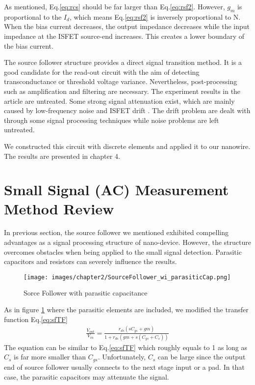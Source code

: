 As mentioned, Eq.\ref{eq:rcs} should be far larger than Eq.\ref{eq:rsf2}.
However, $g_m$ is proportional to the $I_d$, which means Eq.\ref{eq:rsf2} is inversely proportional to N.
When the bias current decreases, the output impedance decreases while the input impedance at the ISFET source-end increases.
This creates a lower boundary of the bias current.

The source follower structure provides a direct signal transition method.
It is a good candidate for the read-out circuit with the aim of detecting transconductance or threshold voltage variance.
Nevertheless, post-processing such as amplification and filtering are necessary.
The experiment results in the article are untreated.
Some strong signal attenuation exist, which are mainly caused by low-frequency noise and ISFET drift \cite{Drift}.
The drift problem are dealt with through some signal processing techniques while noise problems are left untreated.

We constructed this circuit with discrete elements and applied it to our nanowire. The results are presented in chapter 4.


\section{Small Signal (AC) Measurement Method Review}
In previous section, the source follower we mentioned exhibited compelling advantages as a signal processing structure of nano-device.
However, the structure overcomes obstacles when being applied to the small signal detection.
Parasitic capacitors and resistors can severely influence the results.

\begin{figure}[h]
    \centering
    \texttt{[image: images/chapter2/SourceFollower\_wi\_parasiticCap.png]}
    \fontsize{6}{7}\selectfont
    \caption{Sorce Follower with parasitic capacitance}
    \label{fig:SF_pC}
\end{figure}

As in figure \ref{fig:SF_pC} where the parasitic elements are included, we modified the transfer function Eq.\ref{eq:sfTF}
\begin{align}
    \frac{V_{out}}{V_{in}} = \frac{r_{ds}(sC_{gs} + gm)}{1 + r_{ds}(gm + s(C_{gs}+C_s))}
\end{align}
The equation can be similar to Eq.\ref{eq:sfTF} which roughly equals to 1 as long as $C_s$ is far more smaller than $C_{gs}$.
Unfortunately, $C_s$ can be large since the output end of source follower usually connects to the next stage input or a pad.
In that case, the parasitic capacitors may attenuate the signal.

